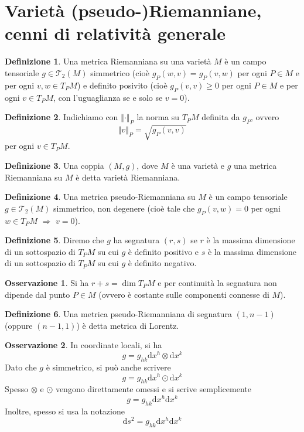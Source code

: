 \documentclass[a4paper,11pt]{article}
\theoremstyle{definition}
\newtheorem{osservazione}{Osservazione}[section]
\newtheorem{definizione}{Definizione}[section]
\theoremstyle{theorem}
\newcommand{\norm}[1]{\left\Vert#1\right\Vert}
\newcommand{\dif}{\mathrm{d}}
\newcommand{\T}{\mathcal{T}}
\begin{document}
\section{Varietà (pseudo-)Riemanniane, cenni di relatività generale}
\begin{definizione}
	Una metrica Riemanniana su una varietà $M$ è un campo tensoriale $g\in\T_2(M)$ simmetrico (cioè $g_P(w,v)=g_P(v,w)$ per ogni $P\in M$ e per ogni $v,w\in T_PM$) e definito posivito (cioè $g_P(v,v)\geq 0$ per ogni $P\in M$ e per ogni $v\in T_PM$, con l'uguaglianza se e solo se $v=0$).
\end{definizione}
\begin{definizione}
	Indichiamo con $\norm{\cdot}_P$ la norma su $T_PM$ definita da $g_P$, ovvero
	\[\norm{v}_P=\sqrt{g_P(v,v)}\]
	per ogni $v\in T_PM$.
\end{definizione}
\begin{definizione}
	Una coppia $(M,g)$, dove $M$ è una varietà e $g$ una metrica Riemanniana su $M$ è detta varietà Riemanniana.
\end{definizione}
\begin{definizione}
	Una metrica pseudo-Riemanniana su $M$ è un campo tensoriale $g\in\T_2(M)$ simmetrico, non degenere (cioè tale che $g_P(v,w)=0$ per ogni $w\in T_PM$ $\Rightarrow$ $v=0$).
\end{definizione}
\begin{definizione}
	Diremo che $g$ ha segnatura $(r,s)$ se $r$ è la massima dimensione di un sottospazio di $T_PM$ su cui $g$ è definito positivo e $s$ è la massima dimensione di un sottospazio di $T_PM$ su cui $g$ è definito negativo.
\end{definizione}
\begin{osservazione}
	Si ha $r+s=\dim T_PM$ e per continuità la segnatura non dipende dal punto $P\in M$ (ovvero è costante sulle componenti connesse di $M$).
\end{osservazione}
\begin{definizione}
	Una metrica pseudo-Riemanniana di segnatura $(1,n-1)$ (oppure $(n-1,1)$) è detta metrica di Lorentz.
\end{definizione}
\begin{osservazione}
	In coordinate locali, si ha
	\[g=g_{hk}\dif x^h\otimes\dif x^k\]
	Dato che $g$ è simmetrico, si può anche scrivere
	\[g=g_{hk}\dif x^h\odot\dif x^k\]
	Spesso $\otimes$ e $\odot$ vengono direttamente omessi e si scrive semplicemente
	\[g=g_{hk}\dif x^h\dif x^k\]
	Inoltre, spesso si usa la notazione
	\[\dif s^2=g_{hk}\dif x^h\dif x^k\]
\end{osservazione}
\end{document}
